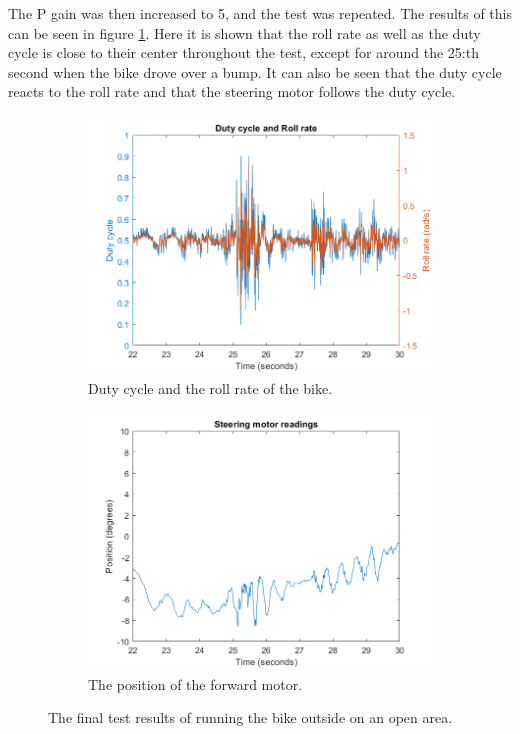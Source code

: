 The P gain was then increased to 5, and the test was repeated. The results of this can be seen in figure \ref{fig:outdoorTest}. Here it is shown that the roll rate as well as the duty cycle is close to their center throughout the test, except for around the 25:th second when the bike drove over a bump. It can also be seen that the duty cycle reacts to the roll rate and that the steering motor follows the duty cycle.

\begin{figure}[H]
    \begin{subfigure}{.5\textwidth}
        \centering
        \includegraphics[width=\textwidth]{figure/dutyAndRoll.png}
        \caption{Duty cycle and the roll rate of the bike.}
    \end{subfigure}
    \begin{subfigure}{.5\textwidth}
        \centering
        \includegraphics[width=\textwidth]{figure/motorPosition.png}
        \caption{The position of the forward motor.}
    \end{subfigure}
\caption{The final test results of running the bike outside on an open area.}
\label{fig:outdoorTest}
\end{figure}